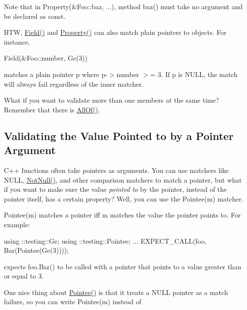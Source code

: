 Note that in {\ttfamily Property(\&Foo\+::baz, ...)}, method {\ttfamily baz()} must take no argument and be declared as {\ttfamily const}.

B\+TW, {\ttfamily \hyperlink{namespacetesting_a4df3849391696aa93ac3a7703a717c2a}{Field()}} and {\ttfamily \hyperlink{namespacetesting_a0fad10571e23f7bc0d5c83d4c31ba740}{Property()}} can also match plain pointers to objects. For instance,


\begin{DoxyCode}
Field(&Foo::number, Ge(3))
\end{DoxyCode}


matches a plain pointer {\ttfamily p} where {\ttfamily p-\/$>$number $>$= 3}. If {\ttfamily p} is {\ttfamily N\+U\+LL}, the match will always fail regardless of the inner matcher.

What if you want to validate more than one members at the same time? Remember that there is {\ttfamily \hyperlink{namespacetesting_af7618e8606c1cb45738163688944e2b7}{All\+Of()}}.

\subsection*{Validating the Value Pointed to by a Pointer Argument}

C++ functions often take pointers as arguments. You can use matchers like {\ttfamily N\+U\+LL}, {\ttfamily \hyperlink{namespacetesting_a39d1f92b53b8b2a0b6db6a22ac146416}{Not\+Null()}}, and other comparison matchers to match a pointer, but what if you want to make sure the value {\itshape pointed to} by the pointer, instead of the pointer itself, has a certain property? Well, you can use the {\ttfamily Pointee(m)} matcher.

{\ttfamily Pointee(m)} matches a pointer iff {\ttfamily m} matches the value the pointer points to. For example\+:


\begin{DoxyCode}
using ::testing::Ge;
using ::testing::Pointee;
...
  EXPECT\_CALL(foo, Bar(Pointee(Ge(3))));
\end{DoxyCode}


expects {\ttfamily foo.\+Bar()} to be called with a pointer that points to a value greater than or equal to 3.

One nice thing about {\ttfamily \hyperlink{namespacetesting_a5122ca3533f3a00f67e146dd81f3b68c}{Pointee()}} is that it treats a {\ttfamily N\+U\+LL} pointer as a match failure, so you can write {\ttfamily Pointee(m)} instead of


